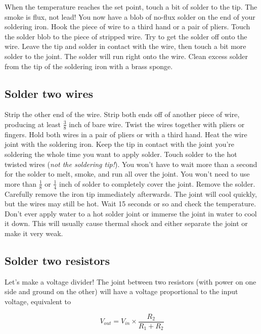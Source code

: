 \documentclass[12pt]{article}
\newcommand{\+}{\item}
\begin{document}
When the temperature reaches the set point, touch a bit of solder to the tip. The smoke is flux, not lead! You now have a blob of no-flux solder on the end of your soldering iron. Hook the piece of wire to a third hand or a pair of pliers. Touch the solder blob to the piece of stripped wire. Try to get the solder off onto the wire. Leave the tip and solder in contact with the wire, then touch a bit more solder to the joint. The solder will run right onto the wire. Clean excess solder from the tip of the soldering iron with a brass sponge.

\subsection{Solder two wires}

Strip the other end of the wire. Strip both ends off of another piece of wire, producing at least $\frac{3}{8}$ inch of bare wire. Twist the wires together with pliers or fingers. Hold both wires in a pair of pliers or with a third hand. Heat the wire joint with the soldering iron. Keep the tip in contact with the joint you're soldering the whole time you want to apply solder. Touch solder to the hot twisted wires (\emph{not the soldering tip!}). You won't have to wait more than a second for the solder to melt, smoke, and run all over the joint. You won't need to use more than $\frac{1}{8}$ or $\frac{1}{4}$ inch of solder to completely cover the joint. Remove the solder. Carefully remove the iron tip immediately afterwards. The joint will cool quickly, but the wires may still be hot. Wait 15 seconds or so and check the temperature. Don't ever apply water to a hot solder joint or immerse the joint in water to cool it down. This will usually cause thermal shock and either separate the joint or make it very weak.

\subsection{Solder two resistors}

Let's make a voltage divider! The joint between two resistors (with power on one side and ground on the other) will have a voltage proportional to the input voltage, equivalent to

\begin{Large}
\begin{equation*}
V_{out} = V_{in} \times \frac{R_2}{R_1 + R_2}
\end{equation*}
\end{Large}
\end{document}
